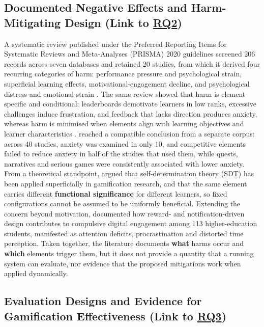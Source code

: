 \documentclass[12pt,a4paper]{article}
\DeclareRobustCommand{\rqlink}[1]{\texorpdfstring{\hyperref[rq:rq#1]{RQ#1}}{RQ#1}}
\begin{document}
\begin{justify}
\subsection{Documented Negative Effects and Harm-Mitigating Design (Link to \rqlink{2})}

A systematic review published under the Preferred Reporting Items for Systematic Reviews and Meta-Analyses (PRISMA) 2020 guidelines screened 206 records across seven databases and retained 20 studies, from which it derived four recurring categories of harm: performance pressure and psychological strain, superficial learning effects, motivational-engagement decline, and psychological distress and emotional strain \parencite{nugroho2025negative}. The same review showed that harm is element-specific and conditional: leaderboards demotivate learners in low ranks, excessive challenges induce frustration, and feedback that lacks direction produces anxiety, whereas harm is minimised when elements align with learning objectives and learner characteristics \parencite{nugroho2025negative}. \textcite{edwards2022anxiety} reached a compatible conclusion from a separate corpus: across 40 studies, anxiety was examined in only 10, and competitive elements failed to reduce anxiety in half of the studies that used them, while quests, narratives and serious games were consistently associated with lower anxiety. From a theoretical standpoint, \textcite{gao2024sdt} argued that self-determination theory (SDT) has been applied superficially in gamification research, and that the same element carries different \textbf{functional significance} for different learners, so fixed configurations cannot be assumed to be uniformly beneficial. Extending the concern beyond motivation, \textcite{gul2026brainrot} documented how reward- and notification-driven design contributes to compulsive digital engagement among 113 higher-education students, manifested as attention deficits, procrastination and distorted time perception. Taken together, the literature documents \textbf{what} harms occur and \textbf{which} elements trigger them, but it does not provide a quantity that a running system can evaluate, nor evidence that the proposed mitigations work when applied dynamically.

\subsection{Evaluation Designs and Evidence for Gamification Effectiveness (Link to \rqlink{3})}
\label{sec:lit-eval}


\end{justify}
\end{document}
